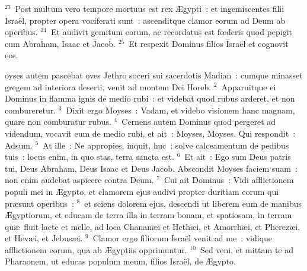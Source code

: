 ${}^{23}$~Post multum vero tempore mortuus est rex \AE gypti~: et ingemiscentes filii Isra\"el, propter opera vociferati sunt~: ascenditque clamor eorum ad Deum ab operibus.
${}^{24}$~Et audivit gemitum eorum, ac recordatus est fœderis quod pepigit cum Abraham, Isaac et Jacob.
${}^{25}$~Et respexit Dominus filios Isra\"el et cognovit eos.

\bchapter
{}oyses autem pascebat oves Jethro soceri sui sacerdotis Madian~: cumque minasset gregem ad interiora deserti, venit ad montem Dei Horeb.
${}^{2}$~Apparuitque ei Dominus in flamma ignis de medio rubi~: et videbat quod rubus arderet, et non combureretur.
${}^{3}$~Dixit ergo Moyses~: Vadam, et videbo visionem hanc magnam, quare non comburatur rubus.
${}^{4}$~Cernens autem Dominus quod pergeret ad videndum, vocavit eum de medio rubi, et ait~: Moyses, Moyses. Qui respondit~: Adsum.
${}^{5}$~At ille~: Ne appropies, inquit, huc~: solve calceamentum de pedibus tuis~: locus enim, in quo stas, terra sancta est.
${}^{6}$~Et ait~: Ego sum Deus patris tui, Deus Abraham, Deus Isaac et Deus Jacob. Abscondit Moyses faciem suam~: non enim audebat aspicere contra Deum.
${}^{7}$~Cui ait Dominus~: Vidi afflictionem populi mei in \AE gypto, et clamorem ejus audivi propter duritiam eorum qui pr\ae sunt operibus~:
${}^{8}$~et sciens dolorem ejus, descendi ut liberem eum de manibus \AE gyptiorum, et educam de terra illa in terram bonam, et spatiosam, in terram qu\ae\ fluit lacte et melle, ad loca Chanan\ae i et Heth\ae i, et Amorrh\ae i, et Pherez\ae i, et Hev\ae i, et Jebus\ae i.
${}^{9}$~Clamor ergo filiorum Isra\"el venit ad me~: vidique afflictionem eorum, qua ab \AE gyptiis opprimuntur.
${}^{10}$~Sed veni, et mittam te ad Pharaonem, ut educas populum meum, filios Isra\"el, de \AE gypto.


